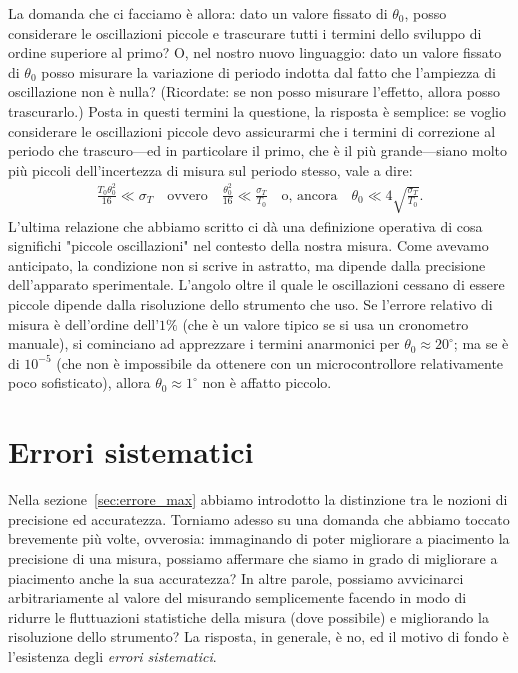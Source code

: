 La domanda che ci facciamo è allora: dato un valore fissato di $\theta_0$,
posso considerare le oscillazioni piccole e trascurare tutti i termini dello
sviluppo di ordine superiore al primo? O, nel nostro nuovo linguaggio: dato
un valore fissato di $\theta_0$ posso misurare la variazione di periodo indotta
dal fatto che l'ampiezza di oscillazione non è nulla? (Ricordate: se non posso
misurare l'effetto, allora posso trascurarlo.) Posta in questi termini la
questione, la risposta è semplice: se voglio considerare le oscillazioni
piccole devo assicurarmi che i termini di correzione al periodo che
trascuro---ed in particolare il primo, che è il più grande---siano molto
più piccoli dell'incertezza di misura sul periodo stesso, vale a dire:
\begin{align}\label{eq:condizione_piccole_oscillazioni}
  \frac{T_0\theta_0^2}{16} \ll \sigma_T
  \quad \text{ovvero} \quad
  \frac{\theta_0^2}{16} \ll \frac{\sigma_T}{T_0}
  \quad \text{o, ancora} \quad
  \theta_0 \ll 4 \sqrt{\frac{\sigma_T}{T_0}}.
\end{align}
L'ultima relazione che abbiamo scritto ci dà una definizione operativa di
cosa significhi "piccole oscillazioni" nel contesto della nostra misura.
Come avevamo anticipato, la condizione non si scrive in astratto, ma dipende
dalla precisione dell'apparato sperimentale. L'angolo oltre il quale le
oscillazioni cessano di essere piccole dipende dalla risoluzione dello
strumento che uso. Se l'errore relativo di misura è dell'ordine dell'$1\%$
(che è un valore tipico se si usa un cronometro manuale), si cominciano ad
apprezzare i termini anarmonici per $\theta_0 \approx 20^\circ$; ma se è di
$10^{-5}$ (che non è impossibile da ottenere con un microcontrollore
relativamente poco sofisticato), allora $\theta_0 \approx 1^\circ$ non è
affatto piccolo.


\section{Errori sistematici}
\label{sec:errori_sistematici}

Nella sezione~\ref{sec:errore_max} abbiamo introdotto la distinzione tra le
nozioni di precisione ed accuratezza. Torniamo adesso su una domanda che
abbiamo toccato brevemente più volte, ovverosia: immaginando di poter
migliorare a piacimento la precisione di una misura, possiamo affermare che
siamo in grado di migliorare a piacimento anche la sua accuratezza? In altre
parole, possiamo avvicinarci arbitrariamente al valore del misurando
semplicemente facendo in modo di ridurre le fluttuazioni statistiche della
misura (dove possibile) e migliorando la risoluzione dello strumento?
La risposta, in generale, è no, ed il motivo di fondo è l'esistenza degli
\emph{errori sistematici}.

